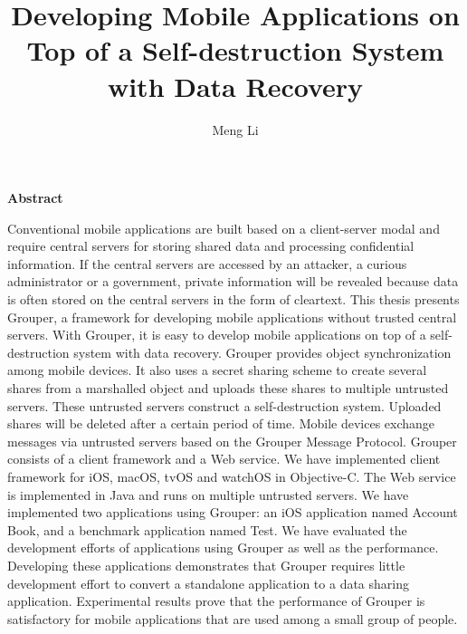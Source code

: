 \documentclass[a4paper,11pt]{report}
\title{Developing Mobile Applications on Top of a Self-destruction System with Data Recovery}
\author{Meng Li}
\begin{document}
		
\maketitle
\thispagestyle{empty}
\newpage

\thispagestyle{empty}
\vspace*{20pt plus 1fil}
\noindent
\begin{center}
{\bf Abstract}
\vspace{5mm}
\end{center}
Conventional mobile applications are built based on a client-server modal and require central servers for storing shared data and processing confidential information.
If the central servers are accessed by an attacker, a curious administrator or a government, private information will be revealed because data is often stored on the central servers in the form of cleartext.
This thesis presents Grouper, a framework for developing mobile applications without trusted central servers.
With Grouper, it is easy to develop mobile applications on top of a self-destruction system with data recovery.
Grouper provides object synchronization among mobile devices.
It also uses a secret sharing scheme to create several shares from a marshalled object and uploads these shares to multiple untrusted servers. 
These untrusted servers construct a self-destruction system.
Uploaded shares will be deleted after a certain period of time.
Mobile devices exchange messages via untrusted servers based on the Grouper Message Protocol.
Grouper consists of a client framework and a Web service.
We have implemented client framework for iOS, macOS, tvOS and watchOS in Objective-C.
The Web service is implemented in Java and runs on multiple untrusted servers.
We have implemented two applications using Grouper: an iOS application named Account Book, and a benchmark application named Test.
We have evaluated the development efforts of applications using Grouper as well as the performance. 
Developing these applications demonstrates that Grouper requires little development effort to convert a standalone application to a data sharing application.
Experimental results prove that the performance of Grouper is satisfactory for mobile applications that are used among a small group of people.


\par
\vspace{0pt plus 1fil}
\newpage

\tableofcontents
\listoffigures
\end{document}
